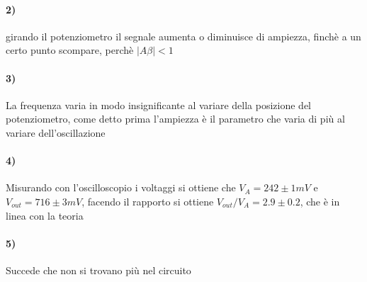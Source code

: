 \documentclass{article}
\begin{document}
\paragraph{2)}
	girando il potenziometro il segnale aumenta o diminuisce di ampiezza, finchè a un certo punto scompare, perchè $|A\beta|<1$
\paragraph{3)}
	La frequenza varia in modo insignificante al variare della posizione del potenziometro, come detto prima l'ampiezza è il parametro che varia di più al variare dell'oscillazione
\paragraph{4)}
	Misurando con l'oscilloscopio i voltaggi si ottiene che $V_{A}=242\pm1mV$ e $V_{out}=716\pm3mV$, facendo il rapporto si ottiene $V_{out}/V_{A}=2.9\pm0.2$, che è in linea con la teoria
\paragraph{5)}
	Succede che non si trovano più nel circuito
\end{document}
